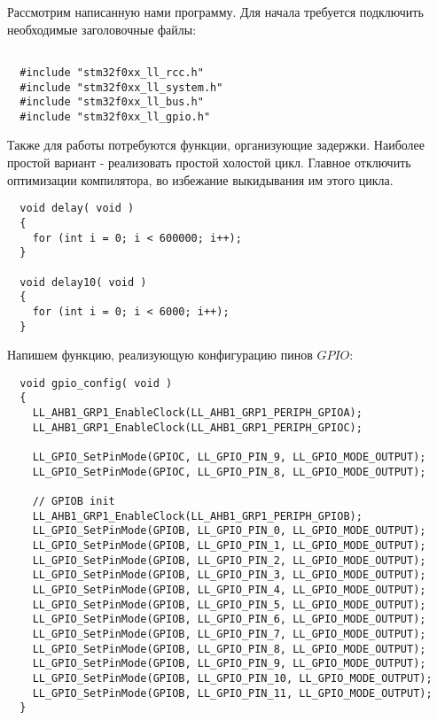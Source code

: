 Рассмотрим написанную нами программу. Для начала требуется подключить 
необходимые заголовочные файлы:

\begin{verbatim}
    
  #include "stm32f0xx_ll_rcc.h"
  #include "stm32f0xx_ll_system.h"
  #include "stm32f0xx_ll_bus.h"
  #include "stm32f0xx_ll_gpio.h"
\end{verbatim}

Также для работы потребуются функции, организующие задержки. 
Наиболее простой вариант - реализовать простой холостой цикл. 
Главное отключить оптимизации компилятора, во избежание
выкидывания им этого цикла.
\begin{verbatim}
  void delay( void )
  {
    for (int i = 0; i < 600000; i++);
  }
  
  void delay10( void )
  {
    for (int i = 0; i < 6000; i++);
  }
\end{verbatim}


Напишем функцию, реализующую конфигурацию пинов $GPIO$:
\begin{verbatim}
  void gpio_config( void )
  {
    LL_AHB1_GRP1_EnableClock(LL_AHB1_GRP1_PERIPH_GPIOA);
    LL_AHB1_GRP1_EnableClock(LL_AHB1_GRP1_PERIPH_GPIOC);
    
    LL_GPIO_SetPinMode(GPIOC, LL_GPIO_PIN_9, LL_GPIO_MODE_OUTPUT);
    LL_GPIO_SetPinMode(GPIOC, LL_GPIO_PIN_8, LL_GPIO_MODE_OUTPUT);
    
    // GPIOB init
    LL_AHB1_GRP1_EnableClock(LL_AHB1_GRP1_PERIPH_GPIOB);
    LL_GPIO_SetPinMode(GPIOB, LL_GPIO_PIN_0, LL_GPIO_MODE_OUTPUT);
    LL_GPIO_SetPinMode(GPIOB, LL_GPIO_PIN_1, LL_GPIO_MODE_OUTPUT);
    LL_GPIO_SetPinMode(GPIOB, LL_GPIO_PIN_2, LL_GPIO_MODE_OUTPUT);
    LL_GPIO_SetPinMode(GPIOB, LL_GPIO_PIN_3, LL_GPIO_MODE_OUTPUT);
    LL_GPIO_SetPinMode(GPIOB, LL_GPIO_PIN_4, LL_GPIO_MODE_OUTPUT);
    LL_GPIO_SetPinMode(GPIOB, LL_GPIO_PIN_5, LL_GPIO_MODE_OUTPUT);
    LL_GPIO_SetPinMode(GPIOB, LL_GPIO_PIN_6, LL_GPIO_MODE_OUTPUT);
    LL_GPIO_SetPinMode(GPIOB, LL_GPIO_PIN_7, LL_GPIO_MODE_OUTPUT);
    LL_GPIO_SetPinMode(GPIOB, LL_GPIO_PIN_8, LL_GPIO_MODE_OUTPUT);
    LL_GPIO_SetPinMode(GPIOB, LL_GPIO_PIN_9, LL_GPIO_MODE_OUTPUT);
    LL_GPIO_SetPinMode(GPIOB, LL_GPIO_PIN_10, LL_GPIO_MODE_OUTPUT);
    LL_GPIO_SetPinMode(GPIOB, LL_GPIO_PIN_11, LL_GPIO_MODE_OUTPUT);
  }
\end{verbatim} 

